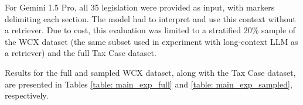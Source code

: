 For Gemini 1.5 Pro, all 35 legislation were provided as input, with markers delimiting each section. The model had to interpret and use this context without a retriever. Due to cost, this evaluation was limited to a stratified 20\% sample of the WCX dataset (the same subset used in experiment with long-context LLM as a retriever) and the full Tax Case dataset.

Results for the full and sampled WCX dataset, along with the Tax Case dataset, are presented in Tables \ref{table: main_exp_full} and \ref{table: main_exp_sampled}, respectively.




\begin{table}[ht]
\centering
\caption{Experiment results on full WCX dataset and full Tax Case dataset}
\renewcommand{\arraystretch}{1.5} %
\label{table: main_exp_full}
\end{table}

